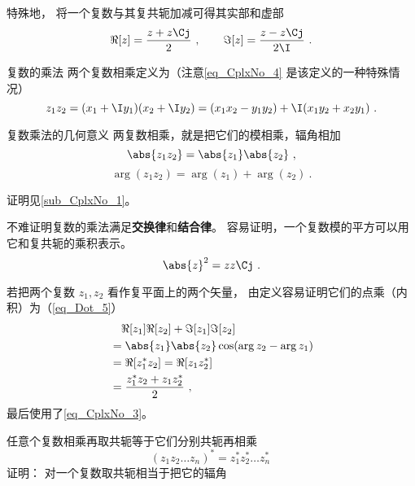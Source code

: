 特殊地， 将一个复数与其复共轭加减可得其实部和虚部
\begin{equation}\label{eq_CplxNo_3}
\Re[z] = \frac{z + z\Cj}{2} ~,\qquad
\Im[z] = \frac{z - z\Cj}{2\I}~.
\end{equation}

\begin{definition}{复数的乘法}
两个复数相乘定义为（注意\autoref{eq_CplxNo_4} 是该定义的一种特殊情况）
\begin{equation}
z_1z_2 = (x_1 + \I y_1)(x_2 + \I y_2) = (x_1 x_2 - y_1 y_2) + \I (x_1 y_2 + x_2 y_1)~.
\end{equation}
\end{definition}

\begin{theorem}{复数乘法的几何意义}\label{the_CplxNo_2}
两复数相乘，就是把它们的模相乘，辐角相加
\begin{equation}\label{eq_CplxNo_10}
\abs{z_1 z_2} = \abs{z_1}\abs{z_2}~,
\end{equation}
\begin{equation}
\arg(z_1 z_2) = \arg(z_1) + \arg(z_2)~.
\end{equation}
\end{theorem}
证明见\autoref{sub_CplxNo_1}。

不难证明复数的乘法满足\textbf{交换律}和\textbf{结合律}。 容易证明，一个复数模的平方可以用它和复共轭的乘积表示。
\begin{equation}\label{eq_CplxNo_2}
\abs{z}^2 = z z\Cj~.
\end{equation}

若把两个复数 $z_1, z_2$ 看作复平面上的两个矢量， 由定义容易证明它们的点乘（内积）为（\autoref{eq_Dot_5}）
\begin{equation}\label{eq_CplxNo_11}
\begin{aligned}
&\quad \Re[z_1] \Re[z_2] + \Im[z_1]\Im[z_2]\\
&= \abs{z_1}\abs{z_2}\cos(\arg z_2 - \arg z_1)\\
&= \Re[z_1^* z_2] = \Re[z_1 z_2^*]\\
&= \frac{z_1^* z_2 + z_1 z_2^*}{2}~,
\end{aligned}
\end{equation}
最后使用了\autoref{eq_CplxNo_3}。

任意个复数相乘再取共轭等于它们分别共轭再相乘
\begin{equation}
(z_1z_2\dots z_n)^* = z_1^*z_2^*\dots z_n^*~
\end{equation}
证明： 对一个复数取共轭相当于把它的辐角

